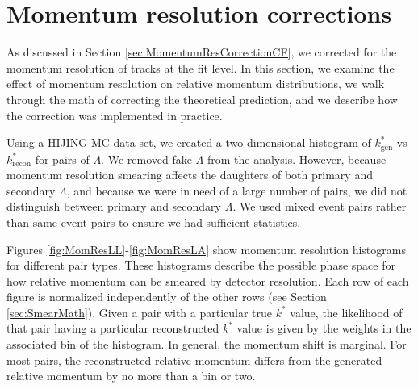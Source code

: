 \section{Momentum resolution corrections}
\label{sec:MomResCorrectFit}

As discussed in Section \ref{sec:MomentumResCorrectionCF}, we corrected for the momentum resolution of tracks at the fit level. 
In this section, we examine the effect of momentum resolution on relative momentum distributions, we walk through the math of correcting the theoretical prediction, and we describe how the correction was implemented in practice.

Using a HIJING MC data set, we created a two-dimensional histogram of $k^*_\mathrm{gen}$ vs $k^*_\mathrm{recon}$ for pairs of $\Lambda$.
We removed fake $\Lambda$ from the analysis.
However, because momentum resolution smearing affects the daughters of both primary and secondary $\Lambda$, and because we were in need of a large number of pairs, we did not distinguish between primary and secondary $\Lambda$.
We used mixed event pairs rather than same event pairs to ensure we had sufficient statistics.

Figures \ref{fig:MomResLL}-\ref{fig:MomResLA} show momentum resolution histograms for different pair types. 
These histograms describe the possible phase space for how relative momentum can be smeared by detector resolution.
Each row of each figure is normalized independently of the other rows (see Section \ref{sec:SmearMath}).
Given a pair with a particular true $k^*$ value, the likelihood of that pair having a particular reconstructed $k^*$ value is given by the weights in the associated bin of the histogram.
In general, the momentum shift is marginal.
For most pairs, the reconstructed relative momentum differs from the generated relative momentum by no more than a bin or two.

